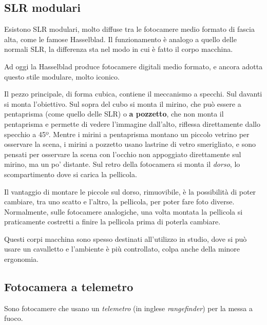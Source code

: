\subsection{SLR modulari} \label{subsec:slrmodulari}
Esistono SLR modulari, molto diffuse tra le fotocamere medio formato di fascia alta, come le famose Hasselblad.
Il funzionamento è analogo a quello delle normali SLR, la differenza sta nel modo in cui è fatto il corpo macchina.

Ad oggi la Hasselblad produce fotocamere digitali medio formato, e ancora adotta questo stile modulare, molto iconico.

Il pezzo principale, di forma cubica, contiene il meccanismo a specchi. Sul davanti si monta l'obiettivo. Sul sopra del cubo si monta il mirino, che può essere a pentaprisma (come quello delle SLR) o \textbf{a pozzetto}, che non monta il pentaprisma e permette di vedere l'immagine dall'alto, riflessa direttamente dallo specchio a 45º. Mentre i mirini a pentaprisma montano un piccolo vetrino per osservare la scena, i mirini a pozzetto usano lastrine di vetro smerigliato, e sono pensati per osservare la scena con l'occhio non appoggiato direttamente sul mirino, ma un po' distante.
Sul retro della fotocamera si monta il \textit{dorso}, lo scompartimento dove si carica la pellicola.

Il vantaggio di montare le piccole sul dorso, rimuovibile, è la possibilità di poter cambiare, tra uno scatto e l'altro, la pellicola, per poter fare foto diverse.
Normalmente, sulle fotocamere analogiche, una volta montata la pellicola si praticamente costretti a finire la pellicola prima di poterla cambiare.

Questi corpi macchina sono spesso destinati all'utilizzo in studio, dove si può usare un cavalletto e l'ambiente è più controllato, colpa anche della minore ergonomia.

%


\subsection{Fotocamera a telemetro} \label{subsec:telemetro}
Sono fotocamere che usano un \textit{telemetro} (in inglese \textit{rangefinder}) per la messa a fuoco.

